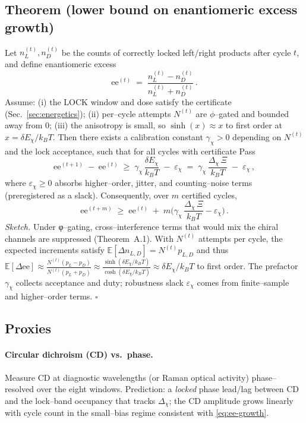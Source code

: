 \documentclass[11pt]{article}
\begin{document}
\subsection{Theorem (lower bound on enantiomeric excess growth)}\label{sec:chi-theorem}
Let $n_L^{(t)},n_D^{(t)}$ be the counts of correctly locked left/right products after cycle $t$, and define enantiomeric excess
\[
\mathrm{ee}^{(t)}\;=\;\frac{n_L^{(t)}-n_D^{(t)}}{n_L^{(t)}+n_D^{(t)}}\,.
\]
Assume: (i) the \textsf{LOCK} window and dose satisfy the certificate (Sec.~\ref{sec:energetics}); (ii) per–cycle attempts $N^{(t)}$ are $\phi$–gated and bounded away from $0$; (iii) the anisotropy is small, so $\sinh(x)\approx x$ to first order at $x=\delta E_\chi/k_BT$. Then there exists a calibration constant $\gamma_\chi>0$ depending on $N^{(t)}$ and the lock acceptance, such that for all cycles with certificate \textsf{Pass}
\begin{equation}\label{eq:ee-growth}
\mathrm{ee}^{(t+1)}\;-\;\mathrm{ee}^{(t)}
\;\ge\;
\gamma_\chi\,\frac{\delta E_\chi}{k_BT}\;-\;\varepsilon_\chi
\;=\;
\gamma_\chi\,\frac{\Delta_{\chi}\,\Xi}{k_BT}\;-\;\varepsilon_\chi\,,
\end{equation}
where $\varepsilon_\chi\ge 0$ absorbs higher–order, jitter, and counting–noise terms (preregistered as a slack). Consequently, over $m$ certified cycles,
\[
\mathrm{ee}^{(t+m)}\;\ge\;\mathrm{ee}^{(t)}\;+\;m\Big(\gamma_\chi\,\frac{\Delta_{\chi}\,\Xi}{k_BT}-\varepsilon_\chi\Big)\,.
\]
\emph{Sketch.} Under φ–gating, cross–interference terms that would mix the chiral channels are suppressed (Theorem~A.1). With $N^{(t)}$ attempts per cycle, the expected increments satisfy
\(
\mathbb{E}[\Delta n_{L,D}] = N^{(t)} p_{L,D}
\)
and thus
\(
\mathbb{E}[\Delta \mathrm{ee}] \approx \tfrac{N^{(t)}(p_L-p_D)}{N^{(t)}(p_L+p_D)} \approx \tfrac{\sinh(\delta E_\chi/k_BT)}{\cosh(\delta E_\chi/k_BT)} \approx \delta E_\chi/k_BT
\)
to first order. The prefactor $\gamma_\chi$ collects acceptance and duty; robustness slack $\varepsilon_\chi$ comes from finite–sample and higher–order terms. \hfill$\square$

\subsection{Proxies}\label{sec:chi-proxies}
\paragraph{Circular dichroism (CD) vs.\ phase.}
Measure CD at diagnostic wavelengths (or Raman optical activity) phase–resolved over the eight windows. Prediction: a \emph{locked} phase lead/lag between CD and the lock–band occupancy that tracks $\Delta_{\chi}$; the CD amplitude grows linearly with cycle count in the small–bias regime consistent with \eqref{eq:ee-growth}.
\end{document}
